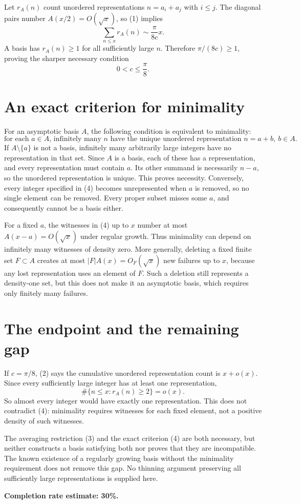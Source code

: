 \documentclass[11pt]{article}
\begin{document}
Let $r_A(n)$ count unordered representations $n=a_i+a_j$ with $i\le j$. The diagonal pairs number $A(x/2)=O(\sqrt x)$, so (1) implies
\[
 \sum_{n\le x}r_A(n)\sim\frac{\pi}{8c}x. \tag{2}
\]
A basis has $r_A(n)\ge1$ for all sufficiently large $n$. Therefore $\pi/(8c)\ge1$, proving the sharper necessary condition
\[
 0<c\le\frac\pi8. \tag{3}
\]

\section*{An exact criterion for minimality}
For an asymptotic basis $A$, the following condition is equivalent to minimality:
\[
 \text{for each }a\in A\text{, infinitely many }n\text{ have the unique unordered representation }n=a+b,\ b\in A. \tag{4}
\]
If $A\setminus\{a\}$ is not a basis, infinitely many arbitrarily large integers have no representation in that set. Since $A$ is a basis, each of these has a representation, and every representation must contain $a$. Its other summand is necessarily $n-a$, so the unordered representation is unique. This proves necessity. Conversely, every integer specified in (4) becomes unrepresented when $a$ is removed, so no single element can be removed. Every proper subset misses some $a$, and consequently cannot be a basis either.

For a fixed $a$, the witnesses in (4) up to $x$ number at most $A(x-a)=O(\sqrt x)$ under regular growth. Thus minimality can depend on infinitely many witnesses of density zero. More generally, deleting a fixed finite set $F\subset A$ creates at most $|F|A(x)=O_F(\sqrt x)$ new failures up to $x$, because any lost representation uses an element of $F$. Such a deletion still represents a density-one set, but this does not make it an asymptotic basis, which requires only finitely many failures.

\section*{The endpoint and the remaining gap}
If $c=\pi/8$, (2) says the cumulative unordered representation count is $x+o(x)$. Since every sufficiently large integer has at least one representation,
\[
 \#\{n\le x:r_A(n)\ge2\}=o(x).
\]
So almost every integer would have exactly one representation. This does not contradict (4): minimality requires witnesses for each fixed element, not a positive density of such witnesses.

The averaging restriction (3) and the exact criterion (4) are both necessary, but neither constructs a basis satisfying both nor proves that they are incompatible. The known existence of a regularly growing basis without the minimality requirement does not remove this gap. No thinning argument preserving all sufficiently large representations is supplied here.

\textbf{Completion rate estimate: 30\%.}
\end{document}
